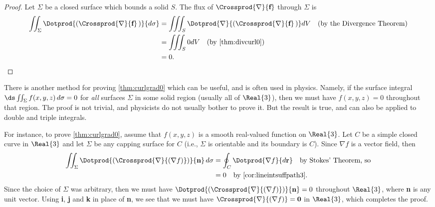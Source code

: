 \begin{proof}
 Let $\Sigma$ be a closed surface which bounds a solid $S$. The flux of $\Crossprod{\nabla}{\textbf{f}}$ through $\Sigma$ is
 \begin{align*}
  \iint_{\Sigma} \Dotprod{(\Crossprod{\nabla}{\textbf{f}}\,)}{d\sigma} &=
   \iiint_{S} \Dotprod{\nabla}{(\Crossprod{\nabla}{\textbf{f}}\,)} dV\quad\text{(by the Divergence Theorem)}\\
   &= \iiint_{S} 0 dV \quad\text{(by \autoref{thm:divcurl0})}\\
   &= 0 .\qedhere
 \end{align*}
\end{proof}

There is another method for proving \autoref{thm:curlgrad0} which can be useful, and is often used in physics. Namely, if the surface integral $\ds\iint_{\Sigma} f(x,y,z)\,d\sigma = 0$ for \emph{all} surfaces $\Sigma$ in some solid region (usually all of $\Real{3}$), then we must have $f(x,y,z) = 0$ throughout that region. The proof is not trivial, and physicists do not usually bother to prove it. But the result is true, and can also be applied to double and triple integrals.

For instance, to prove \autoref{thm:curlgrad0}, assume that $f(x,y,z)$ is a smooth real-valued function on $\Real{3}$. Let $C$ be a simple closed curve in $\Real{3}$ and let $\Sigma$ be any capping surface for $C$ (i.e., $\Sigma$ is orientable and its boundary is $C$). Since $\nabla f$ is a vector field, then
\begin{align*}
 \iint_{\Sigma} \Dotprod{\left( \Crossprod{\nabla}{(\nabla f)} \right) }{\textbf{n}}\,d\sigma &=
  \oint_{C}\Dotprod{\nabla f}{d\textbf{r}} \quad\text{by Stokes' Theorem, so}\\
 &= 0 \quad\text{by \autoref{cor:lineintsuffpath3}.}
\end{align*}
Since the choice of $\Sigma$ was arbitrary, then we must have $\Dotprod{(\Crossprod{\nabla}{(\nabla f)})}{\textbf{n}} = 0$ throughout $\Real{3}$, where \textbf{n} is any unit vector. Using \textbf{i}, \textbf{j} and \textbf{k} in place of \textbf{n}, we see that we must have $\Crossprod{\nabla}{(\nabla f)} = \textbf{0}$ in $\Real{3}$, which completes the proof.

